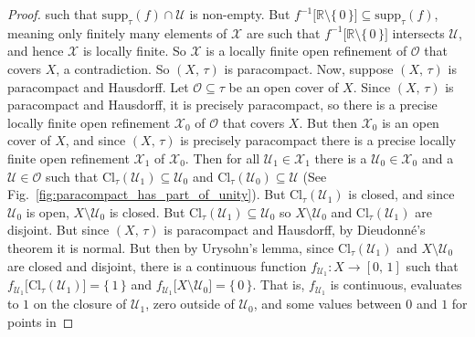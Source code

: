 \documentclass{article}
\theoremstyle{plain}
\theoremstyle{normal}
\begin{document}
\begin{proof}
            such that $\textrm{supp}_{\tau}(f)\cap\mathcal{U}$ is non-empty.
            But $f^{-1}\big[\mathbb{R}\setminus\{\,0\,\}\big]\subseteq\textrm{supp}_{\tau}(f)$,
            meaning only finitely many elements of $\mathcal{X}$ are such that
            $f^{-1}[\mathbb{R}\setminus\{\,0\,\}\big]$ intersects $\mathcal{U}$,
            and hence $\mathcal{X}$ is locally finite. So $\mathcal{X}$ is a
            locally finite open refinement of $\mathcal{O}$ that covers $X$,
            a contradiction. So $(X,\,\tau)$ is paracompact.
            Now, suppose $(X,\,\tau)$ is paracompact and Hausdorff. Let
            $\mathcal{O}\subseteq\tau$ be an open cover of $X$. Since
            $(X,\,\tau)$ is paracompact and Hausdorff, it is precisely
            paracompact, so there is a precise locally finite open refinement
            $\mathcal{X}_{0}$ of $\mathcal{O}$ that covers $X$. But then
            $\mathcal{X}_{0}$ is an open cover of $X$, and since $(X,\,\tau)$
            is precisely paracompact there is a precise locally finite open
            refinement $\mathcal{X}_{1}$ of $\mathcal{X}_{0}$. Then for all
            $\mathcal{U}_{1}\in\mathcal{X}_{1}$ there is a
            $\mathcal{U}_{0}\in\mathcal{X}_{0}$ and a
            $\mathcal{U}\in\mathcal{O}$ such that
            $\textrm{Cl}_{\tau}(\mathcal{U}_{1})\subseteq\mathcal{U}_{0}$ and
            $\textrm{Cl}_{\tau}(\mathcal{U}_{0})\subseteq\mathcal{U}$
            (See Fig.~\ref{fig:paracompact_has_part_of_unity}). But
            $\textrm{Cl}_{\tau}(\mathcal{U}_{1})$ is closed, and since
            $\mathcal{U}_{0}$ is open, $X\setminus\mathcal{U}_{0}$ is closed.
            But $\textrm{Cl}_{\tau}(\mathcal{U}_{1})\subseteq\mathcal{U}_{0}$
            so $X\setminus\mathcal{U}_{0}$ and
            $\textrm{Cl}_{\tau}(\mathcal{U}_{1})$ are disjoint. But since
            $(X,\,\tau)$ is paracompact and Hausdorff, by Dieudonn\'{e}'s
            theorem it is normal. But then by Urysohn's lemma, since
            $\textrm{Cl}_{\tau}(\mathcal{U}_{1})$ and
            $X\setminus\mathcal{U}_{0}$ are closed and disjoint, there is a
            continuous function $f_{\mathcal{U}_{1}}:X\rightarrow[0,\,1]$ such
            that
            $f_{\mathcal{U}_{1}}\big[\textrm{Cl}_{\tau}(\mathcal{U}_{1})\big]=\{\,1\,\}$
            and
            $f_{\mathcal{U}_{1}}\big[X\setminus\mathcal{U}_{0}]=\{\,0\,\}$.
            That is, $f_{\mathcal{U}_{1}}$ is continuous, evaluates to $1$ on
            the closure of $\mathcal{U}_{1}$, zero outside of $\mathcal{U}_{0}$,
            and some values between $0$ and $1$ for points in

\end{proof}
\end{document}
